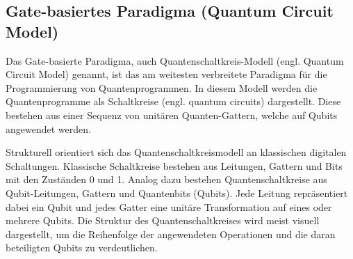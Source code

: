 \subsection{Gate-basiertes Paradigma (Quantum Circuit Model)}
Das Gate-basierte Paradigma, auch Quantenschaltkreis-Modell (engl. Quantum Circuit Model) genannt, ist das am weitesten verbreitete Paradigma für die Programmierung von Quantenprogrammen. In diesem Modell werden die Quantenprogramme als Schaltkreise (engl. quantum circuits) dargestellt. Diese bestehen aus einer Sequenz von unitären Quanten-Gattern, welche auf Qubits angewendet werden.

Strukturell orientiert sich das Quantenschaltkreismodell an klassischen digitalen Schaltungen. Klassische Schaltkreise bestehen aus Leitungen, Gattern und Bits mit den Zuständen 0 und 1. Analog dazu bestehen Quantenschaltkreise aus Qubit-Leitungen, Gattern und Quantenbits (Qubits). Jede Leitung repräsentiert dabei ein Qubit und jedes Gatter eine unitäre Transformation auf eines oder mehrere Qubits. Die Struktur des Quantenschaltkreises wird meist visuell dargestellt, um die Reihenfolge der angewendeten Operationen und die daran beteiligten Qubits zu verdeutlichen.


